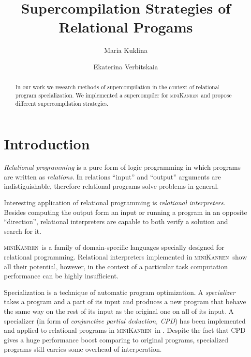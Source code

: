 \documentclass[submission,copyright,creativecommons]{eptcs}
\title{Supercompilation Strategies of Relational Progams}
\author{Maria Kuklina
\institute{ITMO Univeristy\\ Saint Petersburg, Russia}
\email{kuklina.md@gmail.com}
\and
Ekaterina Verbitskaia
\institute{Saint Petersburg State Univeristy\\
Saint Petersburg, Russia}
\email{kajigor@gmail.com}
}
\newcommand{\miniKanren}{\textsc{miniKanren}\ }
\begin{document}
\maketitle

\begin{abstract}

In our work we research methods of supercompilation\cite{introSC} in the context of relational program specialization.
We implemented a supercompiler for \miniKanren and propose different supercompilation strategies.

\end{abstract}

\section{Introduction}

{\it Relational programming} is a pure form of logic programming in which programs are
written as {\it relations}. In relations ``input'' and ``output'' arguments are indistiguishable,
therefore relational programs solve problems in general.

Interesting application of relational programming is {\it relational interpreters}.
Besides computing the output form an input or running a program in an opposite ``direction'',
relational interpreters are capable to both verify a solution and search for it.\cite{lozov2019}

\miniKanren is a family of domain-specific languages specially designed for relational programming.\cite{friedmanSchemer}
Relational interpreters implemented in \miniKanren show all their potential, however, in the context of a particular
task computation performance can be highly insufficient.

Specialization is a technique of automatic program optimization. A {\it specializer} takes a program and a part
of its input and produces a new program that behave the same way on the rest of its input as the original
one on all of its input.\cite{jones1993partial} 
A specializer (in form of {\it conjunctive partial deduction, CPD}) has been implemented and applied to
relational programs in \miniKanren in \cite{lozov2019}. Despite the fact that CPD gives a huge performance boost
comparing to original programs, specialized programs still carries some overhead of interperation.
\end{document}
